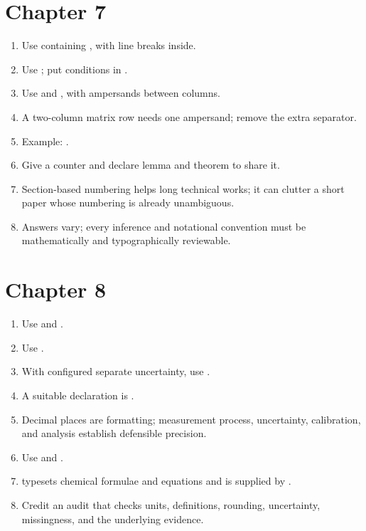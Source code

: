 \section*{Chapter 7}
\begin{enumerate}[label=7.\arabic*,leftmargin=2.4em,itemsep=0.45em]
  \item Use  containing , with line breaks inside.
  \item Use ; put conditions in .
  \item Use  and , with ampersands between columns.
  \item A two-column matrix row needs one ampersand; remove the extra separator.
  \item Example: .
  \item Give  a counter and declare lemma and theorem to share it.
  \item Section-based numbering helps long technical works; it can clutter a
        short paper whose numbering is already unambiguous.
  \item Answers vary; every inference and notational convention must be
        mathematically and typographically reviewable.
\end{enumerate}

\section*{Chapter 8}
\begin{enumerate}[label=8.\arabic*,leftmargin=2.4em,itemsep=0.45em]
  \item Use  and
        .
  \item Use 
        .
  \item With configured separate uncertainty, use
        .
  \item A suitable declaration is .
  \item Decimal places are formatting; measurement process, uncertainty,
        calibration, and analysis establish defensible precision.
  \item Use  and
        .
  \item {} typesets chemical formulae and equations and is supplied by
        .
  \item Credit an audit that checks units, definitions, rounding, uncertainty,
        missingness, and the underlying evidence.
\end{enumerate}

